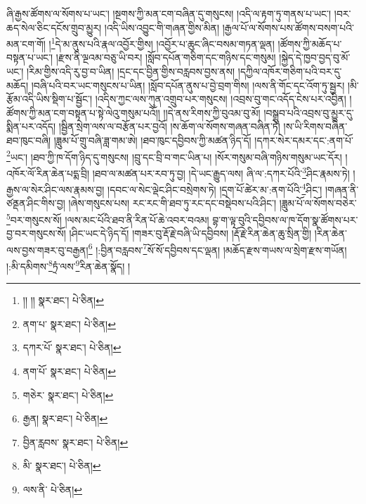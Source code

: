 ཞི་རྒྱས་ཚོགས་ལ་སོགས་པ་ཡང་། །སྔགས་ཀྱི་མན་ངག་བཞིན་དུ་གསུངས། །འདི་ལ་རྟག་ཏུ་གནས་པ་ཡང་། །བར་ཆད་སེལ་ཅིང་དངོས་གྲུབ་མྱུར། །འདི་ཡིས་འབྱུང་གི་གཞན་གྱིས་མིན། །རྒྱལ་པོ་ལ་སོགས་པས་ཚོགས་བསག་པའི་མན་ངག་གོ། །\footnote{།། །།  སྣར་ཐང་།  པེ་ཅིན། }དེ་མ་ནུས་པའི་རྣལ་འབྱོར་གྱིས། །འབྱོར་པ་ཆུང་ཞིང་བསམ་གཏན་ལྡན། །ཚོགས་ཀྱི་མཆོད་པ་བསྟན་པ་ཡང་། །རྫས་ནི་ལྔའམ་བཅུ་ཡི་བར། །སློབ་དཔོན་གཅིག་དང་གཉིས་དང་གསུམ། །སྐྱེད་དེ་ཁྱབ་བྱད་བུ་མོ་ཡང་། །རིམ་གྱིས་འདི་རུ་བྱ་བ་ཡིན། །དྲང་དང་བྱིན་གྱིས་བརླབས་བྱས་ནས། །དཀྱིལ་འཁོར་གཅིག་པའི་བར་དུ་མཆོད། །བཞི་པའི་བར་ཡང་གསུངས་པ་ཡིན། །སློབ་དཔོན་ནུས་པ་བྱེ་བྲག་གིས། །ལས་ནི་གོང་དང་འོག་ཏུ་སྦྱར། །མི་རྩོམ་འདི་ཡིས་སྡིག་པ་སྦྱོང་། །འདིས་ཀྱང་ལས་ཀུན་འགྲུབ་པར་གསུངས། །འབྲས་བུ་གང་འདོད་ངེས་པར་འབྱིན། །ཚོགས་ཀྱི་མན་ངག་བསྟན་པ་སྟེ་ལེའུ་གསུམ་པའོ།། །།དེ་ནས་རིགས་ཀྱི་བུའམ་བུ་མོ། །བསྒྲུབ་པའི་འབྲས་བུ་མྱུར་དུ་སྨིན་པར་འདོད། །སྦྱིན་སྲེག་ལས་ལ་བརྩོན་པར་བྱའོ། །ས་ཆོག་ལ་སོགས་གཞན་བཞིན་ཏེ། །ས་ཡི་རིགས་བཞིན་ཐབ་ཁུང་བཞི། །ཟླུམ་པོ་གྲུ་བཞི་ཟླ་གམ་ཨེ། །ཐབ་ཁུང་དབྱིབས་ཀྱི་མཚན་ཉིད་དོ། །དཀར་སེར་དམར་དང་:ནག་པོ་\footnote{ནག་པ་  སྣར་ཐང་།  པེ་ཅིན། }ཡང་། །ཐབ་ཀྱི་ཁ་དོག་ཉིད་དུ་གསུངས། །བྲུ་དང་བྲི་བ་གང་ཡིན་པ། །སོར་གསུམ་བཞི་གཉིས་གསུམ་ཡང་དོར། །འཁོར་ལོ་རིན་ཆེན་པདྨ་བྲི། །ཐབ་ལ་མཚན་པར་རབ་ཏུ་བྱ། །དེ་ཡང་རྒྱུད་ལས། ཞི་ལ་:དཀར་པོའི་\footnote{དཀར་པོ་  སྣར་ཐང་།  པེ་ཅིན། }ཤིང་རྣམས་ཏེ། །རྒྱས་ལ་སེར་ཤིང་ལས་རྣམས་བྱ། །དབང་ལ་སེང་ལྡེང་ཤིང་བསྲེགས་ཏེ། །དྲག་པོ་ཚེར་མ་:ནག་པོའི་\footnote{ནག་པོ་  སྣར་ཐང་།  པེ་ཅིན། }ཤིང་། །གཞན་ནི་ཙནྡན་ཤིང་གིས་བྱ། །ཞེས་གསུངས་པས། རང་རང་གི་ཐབ་ཏུ་རང་དང་བསྡེབས་པའི་ཤིང་། །ཟླུམ་པོ་ལ་སོགས་བཅེར་\footnote{གཅེར་  སྣར་ཐང་།  པེ་ཅིན། }བར་གསུངས་སོ། །ལས་མང་པོའི་ཐབ་ནི་རིན་པོ་ཆེ་འབར་བའམ། བྷ་ག་ལྟ་བུའི་དབྱིབས་ལ་ཁ་དོག་སྣ་ཚོགས་པར་བྱ་བར་གསུངས་སོ། །ཤིང་ཡང་དེ་ཉིད་དོ། །གཟར་བུ་རྡོ་རྗེ་བཞི་ཡི་དབྱིབས། །རྡོ་རྗེ་རིན་ཆེན་ཆུ་སྲིན་གྱི། །རིན་ཆེན་ལས་བྱས་གཟར་བུ་བརྒྱན།\footnote{རྒྱན།  སྣར་ཐང་།  པེ་ཅིན། } །:བྱིན་བརླབས་\footnote{བྱིན་རླབས་  སྣར་ཐང་།  པེ་ཅིན། }སོ་སོ་དབྱིབས་དང་ལྡན། །མཆོད་རྫས་གཡས་ལ་སྲེག་རྫས་གཡོན། །:མི་དམིགས་\footnote{མི་  སྣར་ཐང་།  པེ་ཅིན། }ཏྲཾ་ལས་\footnote{ལས་ནི་  པེ་ཅིན། }རིན་ཆེན་སྣོད། །
